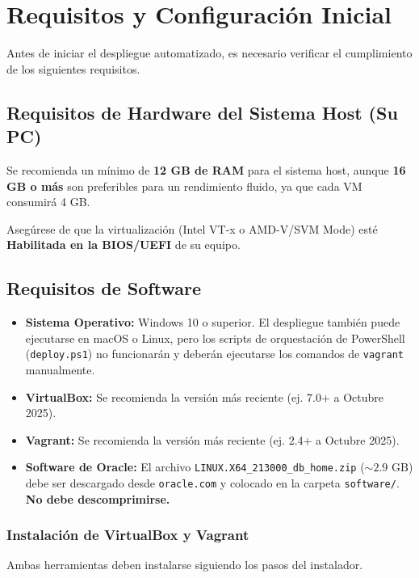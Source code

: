 \documentclass[11pt, a4paper]{report}
\begin{document}
\section{Requisitos y Configuración Inicial}

Antes de iniciar el despliegue automatizado, es necesario verificar el cumplimiento de los siguientes requisitos.
\subsection{Requisitos de Hardware del Sistema Host (Su PC)}

Se recomienda un mínimo de \textbf{12 GB de RAM} para el sistema host, aunque \textbf{16 GB o más} son preferibles para un rendimiento fluido, ya que cada VM consumirá 4 GB.

Asegúrese de que la virtualización (Intel VT-x o AMD-V/SVM Mode) esté \textbf{Habilitada en la BIOS/UEFI} de su equipo.

\subsection{Requisitos de Software}

\begin{itemize}
    \item \textbf{Sistema Operativo:} Windows 10 o superior. El despliegue también puede ejecutarse en macOS o Linux, pero los scripts de orquestación de PowerShell (\texttt{deploy.ps1}) no funcionarán y deberán ejecutarse los comandos de \texttt{vagrant} manualmente.
    \item \textbf{VirtualBox:} Se recomienda la versión más reciente (ej. 7.0+ a Octubre 2025).
    \item \textbf{Vagrant:} Se recomienda la versión más reciente (ej. 2.4+ a Octubre 2025).
    \item \textbf{Software de Oracle:} El archivo \texttt{LINUX.X64\_213000\_db\_home.zip} ($\sim 2.9\text{ GB}$) debe ser descargado desde \texttt{oracle.com} y colocado en la carpeta \texttt{software/}. \textbf{No debe descomprimirse.}
\end{itemize}

\subsubsection{Instalación de VirtualBox y Vagrant}

Ambas herramientas deben instalarse siguiendo los pasos del instalador.
\end{document}

